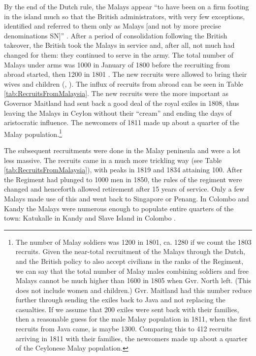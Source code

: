 By the end of the Dutch rule, the Malays appear ``to have been on a firm footing in the island much so that the British administrators, with very few exceptions, identified and referred to them only as Malays [and not by more precise denominations SN]'' \citep[55]{Hussainmiya1987}.
After a period of consolidation following the British takeover,
the British took the Malays in service and, after all, not much had
changed for them: they continued to serve in the army. The total
number of Malays under arms was 1000 in January of 1800 before the
recruiting from abroad started, then 1200 in 1801 \citep[62]{Hussainmiya1990}. The new recruits were allowed to bring their wives and children (\citet[66]{Hussainmiya1990}, \citet[12]{Hussainmiya1987}). The influx of recruits from abroad
can be seen in Table \ref{tab:RecruitsFromMalaysia}.
The new recruits were the more important as Governor Maitland had
sent back a good deal of the royal exiles in 1808, thus leaving
the Malays in Ceylon without their ``cream'' and ending the days of
aristocratic influence. The newcomers of 1811 made up about a quarter of the Malay population.\footnote{The number
 of Malay soldiers was 1200 in 1801, ca. 1280 if we count the 1803 recruits. Given the near-total recruitment of the Malays through the  Dutch, and the British policy to also accept civilians in  the ranks of the Regiment, we can say that the total number of Malay males combining soldiers and free Malays cannot be much higher than 1600 in 1805 when Gvr. North left. (This does not include women and children.)  Gvr. Maitland had this  number reduce further
through sending the exiles back to Java and not replacing the
casualties. If we assume that 200 exiles were sent back with their
families, then a reasonable guess for the male Malay population in
1811, when the first recruits from Java came, is maybe 1300. Comparing
this to 412 recruits arriving in 1811 with their families, the newcomers made up about a quarter of the Ceylonese Malay population.}

The subsequent recruitments were done in the Malay peninsula and were a lot less massive. The recruits came in a much more trickling way (see Table \ref{tab:RecruitsFromMalaysia}), with  peaks in 1819 and 1834 attaining 100.
%
After the Regiment had  plunged to 1000 men in 1850, the rules of the regiment were changed and  henceforth  allowed retirement after 15 years of service. Only a few Malays made use of this and went back to Singapore or Penang.
In Colombo and Kandy the Malays were numerous enough to populate entire quarters of the town: Katukalle in Kandy and Slave Island in Colombo \citep[111f]{Hussainmiya1990}.


